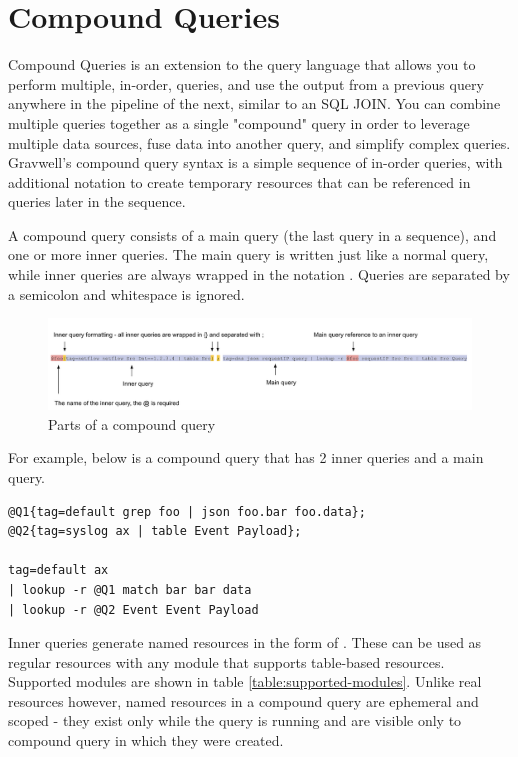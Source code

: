 \clearpage
\section{Compound Queries}
\label{sec:compoundqueries}
Compound Queries is an extension to the query language that allows you to
perform multiple, in-order, queries, and use the output from a previous query
anywhere in the pipeline of the next, similar to an SQL JOIN. You can combine
multiple queries together as a single "compound" query in order to leverage
multiple data sources, fuse data into another query, and simplify complex
queries. Gravwell's compound query syntax is a simple sequence of in-order
queries, with additional notation to create temporary resources that can be
referenced in queries later in the sequence.

A compound query consists of a main query (the last query in a sequence), and
one or more inner queries. The main query is written just like a normal query,
while inner queries are always wrapped in the notation
.  Queries are separated by a semicolon and
whitespace is ignored.

\begin{figure}
	\includegraphics[width=0.9\linewidth]{images/compound-breakdown.png}
	\caption{Parts of a compound query}
	\label{fig:compound-breakdown}
\end{figure}

For example, below is a compound query that has 2 inner queries and a main
query. 

\begin{verbatim}
@Q1{tag=default grep foo | json foo.bar foo.data};
@Q2{tag=syslog ax | table Event Payload};

tag=default ax 
| lookup -r @Q1 match bar bar data 
| lookup -r @Q2 Event Event Payload
\end{verbatim}

Inner queries generate named resources in the form of .
These can be used as regular resources with any module that supports
table-based resources. Supported modules are shown in table
\ref{table:supported-modules}. Unlike real resources however, named resources
in a compound query are ephemeral and scoped - they exist only while the query
is running and are visible only to compound query in which they were created.

